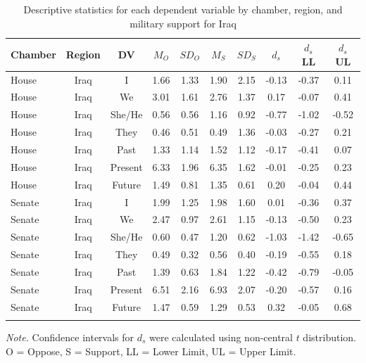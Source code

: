 \documentclass[english,man]{apa6}
\theoremstyle{definition}
\theoremstyle{definition}
\theoremstyle{definition}
\theoremstyle{remark}
\begin{document}
\begin{table}[tbp]
\begin{center}
\begin{threeparttable}
\caption{\label{tab:Itable}Descriptive statistics for each dependent variable by chamber, 
          region, and military support for Iraq}
\small{
\begin{tabular}{lccccccccc}
\toprule
Chamber & Region & DV & $M_O$ & $SD_O$ & $M_S$ & $SD_S$ & $d_s$ & $d_s$ LL & $d_s$ UL\\
\midrule
House & Iraq & I & 1.66 & 1.33 & 1.90 & 2.15 & -0.13 & -0.37 & 0.11\\
House & Iraq & We & 3.01 & 1.61 & 2.76 & 1.37 & 0.17 & -0.07 & 0.41\\
House & Iraq & She/He & 0.56 & 0.56 & 1.16 & 0.92 & -0.77 & -1.02 & -0.52\\
House & Iraq & They & 0.46 & 0.51 & 0.49 & 1.36 & -0.03 & -0.27 & 0.21\\
House & Iraq & Past & 1.33 & 1.14 & 1.52 & 1.12 & -0.17 & -0.41 & 0.07\\
House & Iraq & Present & 6.33 & 1.96 & 6.35 & 1.62 & -0.01 & -0.25 & 0.23\\
House & Iraq & Future & 1.49 & 0.81 & 1.35 & 0.61 & 0.20 & -0.04 & 0.44\\
Senate & Iraq & I & 1.99 & 1.25 & 1.98 & 1.60 & 0.01 & -0.36 & 0.37\\
Senate & Iraq & We & 2.47 & 0.97 & 2.61 & 1.15 & -0.13 & -0.50 & 0.23\\
Senate & Iraq & She/He & 0.60 & 0.47 & 1.20 & 0.62 & -1.03 & -1.42 & -0.65\\
Senate & Iraq & They & 0.49 & 0.32 & 0.56 & 0.40 & -0.19 & -0.55 & 0.18\\
Senate & Iraq & Past & 1.39 & 0.63 & 1.84 & 1.22 & -0.42 & -0.79 & -0.05\\
Senate & Iraq & Present & 6.51 & 2.16 & 6.93 & 2.07 & -0.20 & -0.57 & 0.16\\
Senate & Iraq & Future & 1.47 & 0.59 & 1.29 & 0.53 & 0.32 & -0.05 & 0.68\\
\bottomrule
\addlinespace
\end{tabular}
}
\begin{tablenotes}[para]
\textit{Note.} Confidence intervals for $d_s$ were calculated using 
          non-central $t$ distribution. O = Oppose, S = Support, LL = Lower Limit, UL = Upper Limit.
\end{tablenotes}
\end{threeparttable}
\end{center}
\end{table}
\end{document}
